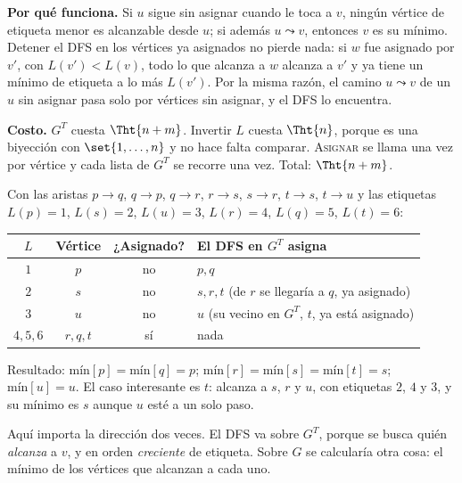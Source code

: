 \documentclass[11pt,letterpaper]{article}
\begin{document}
\textbf{Por qué funciona.} Si $u$ sigue sin asignar cuando le toca a
$v$, ningún vértice de etiqueta menor es alcanzable desde $u$; si
además $u \leadsto v$, entonces $v$ es su mínimo. Detener el DFS en los
vértices ya asignados no pierde nada: si $w$ fue asignado por $v'$, con
$L(v') < L(v)$, todo lo que alcanza a $w$ alcanza a $v'$ y ya tiene un
mínimo de etiqueta a lo más $L(v')$. Por la misma razón, el camino
$u \leadsto v$ de un $u$ sin asignar pasa solo por vértices sin
asignar, y el DFS lo encuentra.

\textbf{Costo.} $G^T$ cuesta $\Tht{n + m}$. Invertir $L$ cuesta
$\Tht{n}$, porque es una biyección con $\set{1, \dots, n}$ y no hace
falta comparar. \textsc{Asignar} se llama una vez por vértice y cada
lista de $G^T$ se recorre una vez. Total: $\Tht{n + m}$.

\begin{ejemplo}
  \label{ej:minimos-alcanzables}
  Con las aristas $p \to q$, $q \to p$, $q \to r$, $r \to s$,
  $s \to r$, $t \to s$, $t \to u$ y las etiquetas $L(p) = 1$,
  $L(s) = 2$, $L(u) = 3$, $L(r) = 4$, $L(q) = 5$, $L(t) = 6$:
  \begin{center}
  \small
  \begin{tabular}{cccl}
    \toprule
    $L$ & \textbf{Vértice} & \textbf{¿Asignado?}
      & \textbf{El DFS en $G^T$ asigna} \\
    \midrule
    $1$ & $p$ & no & $p, q$ \\
    $2$ & $s$ & no & $s, r, t$ (de $r$ se llegaría a $q$, ya
      asignado) \\
    $3$ & $u$ & no & $u$ (su vecino en $G^T$, $t$, ya está
      asignado) \\
    $4, 5, 6$ & $r, q, t$ & sí & nada \\
    \bottomrule
  \end{tabular}
  \end{center}
  Resultado: $\text{mín}[p] = \text{mín}[q] = p$;
  $\text{mín}[r] = \text{mín}[s] = \text{mín}[t] = s$;
  $\text{mín}[u] = u$. El caso interesante es $t$: alcanza a $s$, $r$
  y $u$, con etiquetas $2$, $4$ y $3$, y su mínimo es $s$ aunque $u$
  esté a un solo paso.
\end{ejemplo}

\begin{ojo}
  Aquí importa la dirección dos veces. El DFS va sobre $G^T$, porque se
  busca quién \emph{alcanza} a $v$, y en orden \emph{creciente} de
  etiqueta. Sobre $G$ se calcularía otra cosa: el mínimo de los
  vértices que alcanzan a cada uno.
\end{ojo}
\end{document}
